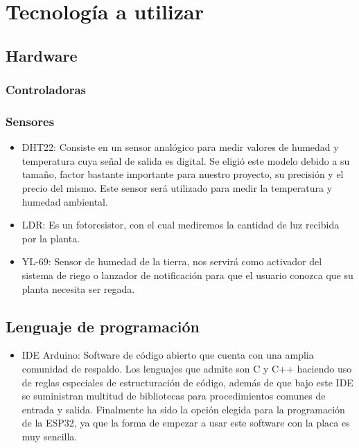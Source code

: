 
\section{Tecnología a utilizar}

\subsection*{Hardware}
\subsubsection*{Controladoras}

\subsubsection*{Sensores}
\begin{itemize}
    \item DHT22: Consiste en un sensor analógico para medir valores de humedad y temperatura cuya señal de salida es digital.  Se eligió este modelo debido a su tamaño, factor bastante importante para nuestro proyecto, su precisión y el precio del mismo. \newline Este sensor será utilizado para medir la temperatura y humedad ambiental.
    \item LDR: Es un fotoresistor, con el cual mediremos la cantidad de luz recibida por la planta.
    \item YL-69: Sensor de humedad de la tierra, nos servirá como activador del sistema de riego o lanzador de notificación para que el usuario conozca que su planta necesita ser regada.
\end{itemize}

\subsection*{Lenguaje de programación}

\begin{itemize}
    
    \item IDE Arduino:  Software de código abierto que cuenta con una amplia comunidad de respaldo. Los lenguajes que admite son C y C++ haciendo uso de reglas especiales de estructuración de código, además de que bajo este IDE se suministran multitud de bibliotecas para procedimientos comunes de entrada y salida. Finalmente ha sido la opción elegida para la programación de la ESP32, ya que la forma de empezar a usar este software con la placa es muy sencilla.
    
\end{itemize}


